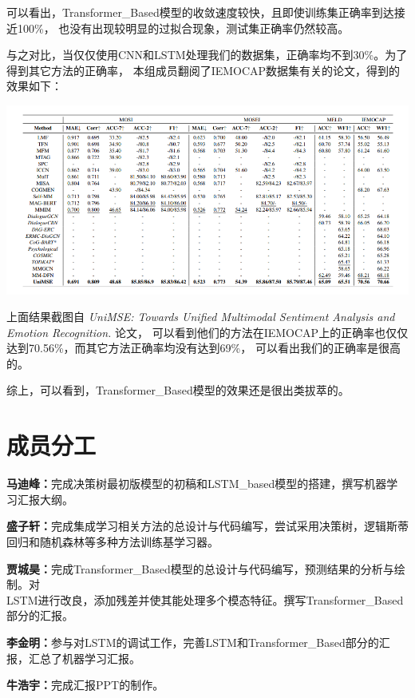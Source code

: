 \documentclass[11pt]{article}
\begin{document}
            可以看出，Transformer\_Based模型的收敛速度较快，且即使训练集正确率到达接近100\%，
            也没有出现较明显的过拟合现象，测试集正确率仍然较高。
            
            与之对比，当仅仅使用CNN和LSTM处理我们的数据集，正确率均不到30\%。为了得到其它方法的正确率，
            本组成员翻阅了IEMOCAP数据集有关的论文，得到的效果如下：

            \begin{center}
                \includegraphics[scale=0.9]{graph/result7.png}
            \end{center}

            上面结果截图自\textit{ UniMSE: Towards Unified Multimodal Sentiment Analysis and Emotion Recognition. }论文，
            可以看到他们的方法在IEMOCAP上的正确率也仅仅达到70.56\%，而其它方法正确率均没有达到69\%，
            可以看出我们的正确率是很高的。
            
            综上，可以看到，Transformer\_Based模型的效果还是很出类拔萃的。

    \section{成员分工}
    \textbf{马迪峰：}完成决策树最初版模型的初稿和LSTM\_based模型的搭建，撰写机器学习汇报大纲。

    \textbf{盛子轩：}完成集成学习相关方法的总设计与代码编写，尝试采用决策树，逻辑斯蒂回归和随机森林等多种方法训练基学习器。

    \textbf{贾城昊：}完成Transformer\_Based模型的总设计与代码编写，预测结果的分析与绘制。对\\LSTM进行改良，添加残差并使其能处理多个模态特征。撰写Transformer\_Based部分的汇报。

    \textbf{李金明：}参与对LSTM的调试工作，完善LSTM和Transformer\_Based部分的汇报，汇总了机器学习汇报。

    \textbf{牛浩宇：}完成汇报PPT的制作。
\end{document}
